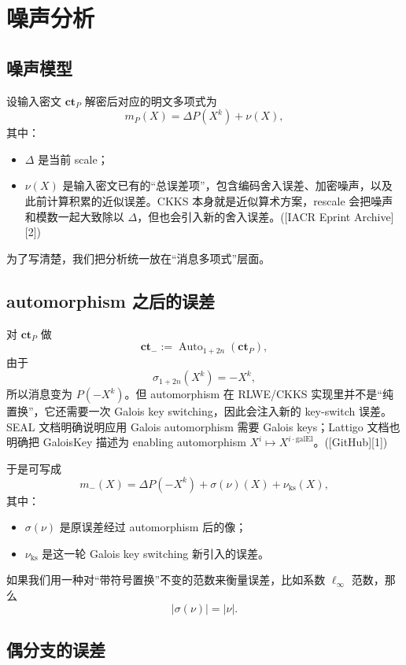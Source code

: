 \documentclass{article}
\newcommand{\Auto}{\operatorname{Auto}}
\newcommand{\ct}{\mathbf{ct}}
\begin{document}
\section{噪声分析}

\subsection{噪声模型}

设输入密文 \(\ct_P\) 解密后对应的明文多项式为
\[
m_P(X)=\Delta P(X^k)+\nu(X),
\]
其中：

\begin{itemize}
    \item \(\Delta\) 是当前 scale；
    \item \(\nu(X)\) 是输入密文已有的“总误差项”，包含编码舍入误差、加密噪声，以及此前计算积累的近似误差。CKKS 本身就是近似算术方案，rescale 会把噪声和模数一起大致除以 \(\Delta\)，但也会引入新的舍入误差。([IACR Eprint Archive][2])
\end{itemize}

为了写清楚，我们把分析统一放在“消息多项式”层面。

\subsection{automorphism 之后的误差}

对 \(\ct_P\) 做
\[
\ct_{-}:=\Auto_{1+2n}(\ct_P),
\]
由于
\[
\sigma_{1+2n}(X^k)=-X^k,
\]
所以消息变为 \(P(-X^k)\)。但 automorphism 在 RLWE/CKKS 实现里并不是“纯置换”，它还需要一次 Galois key switching，因此会注入新的 key-switch 误差。SEAL 文档明确说明应用 Galois automorphism 需要 Galois keys；Lattigo 文档也明确把 GaloisKey 描述为 enabling automorphism \(X^i\mapsto X^{i\cdot \mathrm{galEl}}\)。([GitHub][1])

于是可写成
\[
m_{-}(X)=\Delta P(-X^k)+\sigma(\nu)(X)+\nu_{\mathrm{ks}}(X),
\]
其中：

\begin{itemize}
    \item \(\sigma(\nu)\) 是原误差经过 automorphism 后的像；
    \item \(\nu_{\mathrm{ks}}\) 是这一轮 Galois key switching 新引入的误差。
\end{itemize}

如果我们用一种对“带符号置换”不变的范数来衡量误差，比如系数 \(\ell_\infty\) 范数，那么
\[
|\sigma(\nu)|=|\nu|.
\]

\subsection{偶分支的误差}
\end{document}
